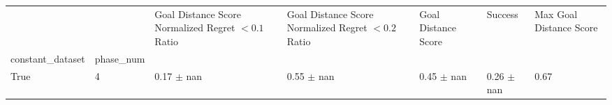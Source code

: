 \begin{tabular}{lllllll}
\toprule
 &  & Goal Distance Score Normalized Regret $< 0.1$ Ratio & Goal Distance Score Normalized Regret $< 0.2$ Ratio & Goal Distance Score & Success & Max Goal Distance Score \\
constant_dataset & phase_num &  &  &  &  &  \\
\midrule
True & 4 & 0.17 $\pm$ nan & 0.55 $\pm$ nan & 0.45 $\pm$ nan & 0.26 $\pm$ nan & 0.67 \\
\cline{1-7}
\bottomrule
\end{tabular}
